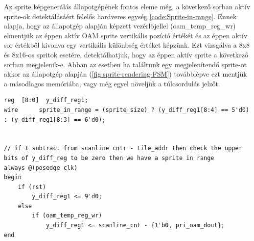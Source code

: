 	Az sprite képgenerálás állapotgépének fontos eleme még, a következő sorban aktív sprite-ok detektálásáért felelős hardveres egység \ref{code:Sprite-in-range}. Ennek alapja, hogy az állapotgép alapján képzett vezérlőjellel (oam\_temp\_reg\_wr) elmentjük az éppen aktív OAM sprite vertikális pozíció értékét és az éppen aktív sor értékből kivonva egy vertikális különbség értéket képzünk. Ezt vizsgálva a 8x8 és 8x16-os spritok esetére, detektálhatjuk, hogy az éppen aktív sprite a következő sorban megjelenik-e. Abban az esetben ha találtunk egy megjelenítendő sprite-ot akkor az állapotgép alapján (\ref{fig:sprite-rendering-FSM}) továbblépve ezt mentjük a másodlagos memóriába, vagy még egyel növeljük a túlcsordulás jelzőt. 

\begin{lstlisting}[caption={A következő kép generálási sorban aktív sprite-ok jelzése}, label={code:Sprite-in-range}, style=prettyverilog]
reg  [8:0]  y_diff_reg1;
wire      sprite_in_range = (sprite_size) ? (y_diff_reg1[8:4] == 5'd0) : (y_diff_reg1[8:3] == 6'd0);


// if I subtract from scanline cntr - tile_addr then check the upper bits of y_diff_reg to be zero then we have a sprite in range
always @(posedge clk) 
begin
	if (rst)
		y_diff_reg1 <= 9'd0;
	else
		if (oam_temp_reg_wr)
			y_diff_reg1 <= scanline_cnt - {1'b0, pri_oam_dout};    
end\end{lstlisting}

